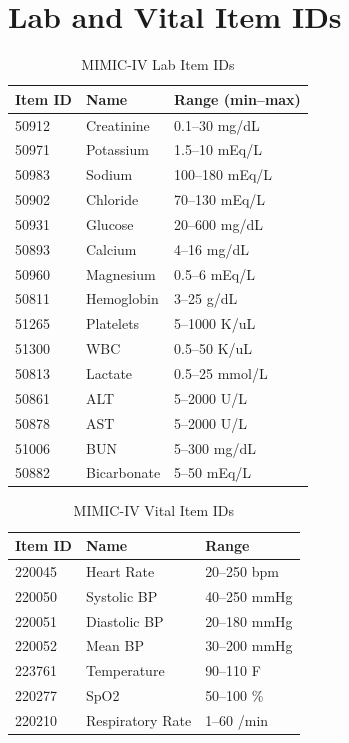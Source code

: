 \section{Lab and Vital Item IDs}

\begin{table}[h]
\centering
\caption{MIMIC-IV Lab Item IDs}
\begin{tabular}{lll}
\toprule
Item ID & Name & Range (min--max) \\
\midrule
50912 & Creatinine & 0.1--30 mg/dL \\
50971 & Potassium & 1.5--10 mEq/L \\
50983 & Sodium & 100--180 mEq/L \\
50902 & Chloride & 70--130 mEq/L \\
50931 & Glucose & 20--600 mg/dL \\
50893 & Calcium & 4--16 mg/dL \\
50960 & Magnesium & 0.5--6 mEq/L \\
50811 & Hemoglobin & 3--25 g/dL \\
51265 & Platelets & 5--1000 K/uL \\
51300 & WBC & 0.5--50 K/uL \\
50813 & Lactate & 0.5--25 mmol/L \\
50861 & ALT & 5--2000 U/L \\
50878 & AST & 5--2000 U/L \\
51006 & BUN & 5--300 mg/dL \\
50882 & Bicarbonate & 5--50 mEq/L \\
\bottomrule
\end{tabular}
\end{table}

\begin{table}[h]
\centering
\caption{MIMIC-IV Vital Item IDs}
\begin{tabular}{lll}
\toprule
Item ID & Name & Range \\
\midrule
220045 & Heart Rate & 20--250 bpm \\
220050 & Systolic BP & 40--250 mmHg \\
220051 & Diastolic BP & 20--180 mmHg \\
220052 & Mean BP & 30--200 mmHg \\
223761 & Temperature & 90--110 F \\
220277 & SpO2 & 50--100 \% \\
220210 & Respiratory Rate & 1--60 /min \\
\bottomrule
\end{tabular}
\end{table}
